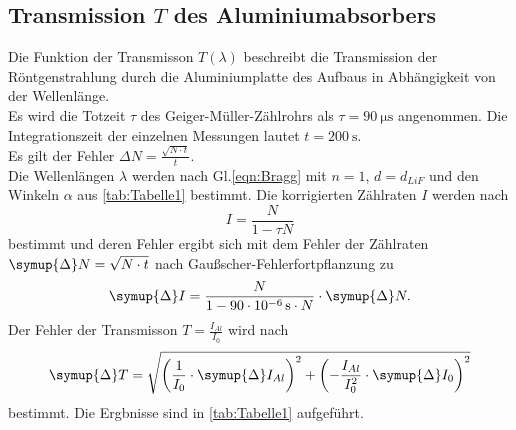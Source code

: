 \subsection{Transmission $T$ des Aluminiumabsorbers}
\label{subsec:transmission}

Die Funktion der Transmisson $T(\lambda)$ beschreibt die Transmission der 
Röntgenstrahlung durch die Aluminiumplatte des Aufbaus in Abhängigkeit von der Wellenlänge.\\

\noindent Es wird die Totzeit $\tau$ des Geiger-Müller-Zählrohrs als $\tau = \SI{90}{\micro\second}$ angenommen. Die 
Integrationszeit der einzelnen Messungen lautet $t = \SI{200}{\second}$. \\
Es gilt der Fehler $\Delta N = \frac{\sqrt{N \cdot t}}{t}$.\\
Die Wellenlängen $\lambda$ werden nach Gl.\eqref{eqn:Bragg} mit $n=1$, $d=d_{LiF}$ und den Winkeln $\alpha$ aus \autoref{tab:Tabelle1} bestimmt.
Die korrigierten Zählraten $I$ werden nach
\begin{equation*}
  I = \frac{N}{1-\tau N}
\end{equation*}
bestimmt und deren Fehler ergibt sich mit dem Fehler der Zählraten $\symup{\Delta}N = \sqrt{N\cdot t}$ nach Gaußscher-Fehlerfortpflanzung zu
\begin{equation*}
  \symup{\Delta}I = \frac{N}{1-\SI{90e-6}{\second}\cdot N}\cdot \symup{\Delta}N.
\end{equation*}
Der Fehler der Transmisson $T = \frac{I_{Al}}{I_0}$ wird nach
\begin{equation*}
  \symup{\Delta}T=\sqrt{\left(\frac{1}{I_0}\cdot\symup{\Delta}I_{Al}\right)^2+\left(-\frac{I_{Al}}{I_0^2}\cdot\symup{\Delta}I_{0}\right)^2}
\end{equation*}
bestimmt. Die Ergbnisse sind in \autoref{tab:Tabelle1} aufgeführt.
